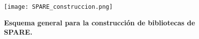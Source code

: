 \begin{figure}[htbp!]
	\centering    
	\texttt{[image: SPARE\_construccion.png]}
	\caption[Esquema general para la construcción de bibliotecas de SPARE]{
		\textbf{Esquema general para la construcción de bibliotecas de SPARE.}
	}
	 \label{fig:SPARE_construccion}
\end{figure}



